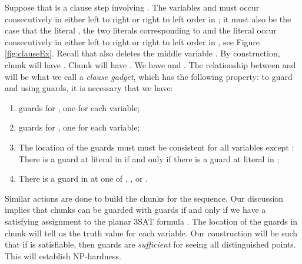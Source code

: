 \documentclass[11pt]{article}
\begin{document}
Suppose that  is a clause step involving .  The variables  and  must occur consecutively in either left to right or right to left order in ; it must also be the case that the literal , the two literals corresponding to  and the literal  occur consecutively in either left to right or right to left order in , see Figure \ref{fig:clauseEx}.  Recall that  also deletes the middle variable .  By construction, chunk  will have .  Chunk  will have .  We have  and . The relationship between  and  will be what we call a \textit{clause gadget}, which has the following property: to guard  and  using  guards, it is necessary that we have:

\begin{enumerate}
 \item  guards for , one for each variable;
 \item  guards for , one for each variable;
 \item The location of the guards must must be consistent for all variables except : There is a guard at literal  in  if and only if there is a guard at literal  in ;
 \item There is a guard in  at one of , , or .
\end{enumerate}

Similar actions are done to build the chunks  for the  sequence.  Our discussion implies that chunks  can be guarded with  guards if and only if we have a satisfying assignment to the planar 3SAT formula .  The location of the guards in chunk  will tell us the truth value for each variable.  Our construction will be such that if  is satisfiable, then  guards are {\em sufficient} for seeing all distinguished points.  This will establish NP-hardness.
\end{document}
